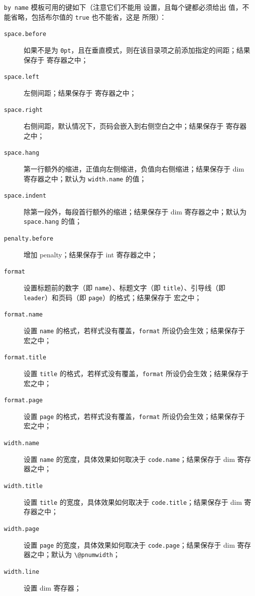 \documentclass{cusdoc}
\begin{document}
\texttt{by name} 模板可用的键如下（注意它们不能用  设置，且每个键都必须给出
值，不能省略，包括布尔值的 \texttt{true} 也不能省，这是  所限）：
\begin{description}
  \item[\texttt{space.before}] 如果不是为 \texttt{0pt}，且在垂直模式，则在该目录项之前添加指定的间距；结果保存于  寄存器之中；
  \item[\texttt{space.left}] 左侧间距；结果保存于  寄存器之中；
  \item[\texttt{space.right}] 右侧间距，默认情况下，页码会嵌入到右侧空白之中；结果保存于  寄存器之中；
  \item[\texttt{space.hang}] 第一行额外的缩进，正值向左侧缩进，负值向右侧缩进；结果保存于  dim 寄存器之中；默认为 \texttt{width.name} 的值；
  \item[\texttt{space.indent}] 除第一段外，每段首行额外的缩进；结果保存于  dim 寄存器之中；默认为 \texttt{space.hang} 的值；
  \item[\texttt{penalty.before}] 增加 penalty；结果保存于  int 寄存器之中；
  \item[\texttt{format}] 设置标题前的数字（即 \texttt{name}）、标题文字（即 \texttt{title}）、引导线（即 \texttt{leader}）和页码（即 \texttt{page}）的格式；结果保存于  宏之中；
  \item[\texttt{format.name}] 设置 \texttt{name} 的格式，若样式没有覆盖，\texttt{format} 所设仍会生效；结果保存于  宏之中；
  \item[\texttt{format.title}] 设置 \texttt{title} 的格式，若样式没有覆盖，\texttt{format} 所设仍会生效；结果保存于  宏之中；
  \item[\texttt{format.page}] 设置 \texttt{page} 的格式，若样式没有覆盖，\texttt{format} 所设仍会生效；结果保存于  宏之中；
  \item[\texttt{width.name}] 设置 \texttt{name} 的宽度，具体效果如何取决于 \texttt{code.name}；结果保存于  dim 寄存器之中；
  \item[\texttt{width.title}] 设置 \texttt{title} 的宽度，具体效果如何取决于 \texttt{code.title}；结果保存于  dim 寄存器之中；
  \item[\texttt{width.page}] 设置 \texttt{page} 的宽度，具体效果如何取决于 \texttt{code.page}；结果保存于  dim 寄存器之中；默认为 \verb|\@pnumwidth|；
  \item[\texttt{width.line}] 设置  dim 寄存器；

\end{description}
\end{document}
